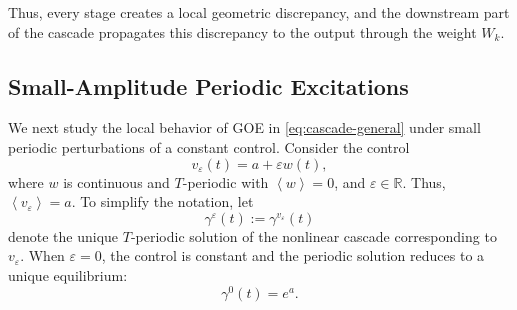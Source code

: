 \documentclass[onecolumn]{IEEEtran}
\newcommand{\R}{\mathbb{R}}
\newcommand{\avg}[1]{\left\langle #1\right\rangle}
\begin{document}
          
Thus,  every stage creates a local geometric discrepancy, and the
downstream part of the cascade propagates  this discrepancy to the output
through the weight $W_k$.

\subsection{Small-Amplitude Periodic Excitations}
\label{sec:small-amplitude}

We next study the local behavior of GOE in \eqref{eq:cascade-general} under small periodic
perturbations of a constant control.   
Consider the control 
\begin{equation}
    v_\varepsilon(t)
    =
    a +\varepsilon w(t),
    \label{eq:small-input}
\end{equation}
where $w$ is continuous and     $T$-periodic with $ \avg{w}=0$, and $\varepsilon\in\R$. Thus,~$\avg{v_\varepsilon}=a$. 
To simplify the notation, let 
\begin{equation*}
    \gamma^\varepsilon(t)
    :=
    \gamma^{v_\varepsilon}(t)
\end{equation*}
denote the unique $T$-periodic solution of the nonlinear cascade
corresponding to $v_\varepsilon$. When $\varepsilon=0$, the control is constant
and the periodic solution reduces to a unique  equilibrium:
\begin{equation*}
    \gamma^0(t)=e^{a}.
\end{equation*}
\end{document}
